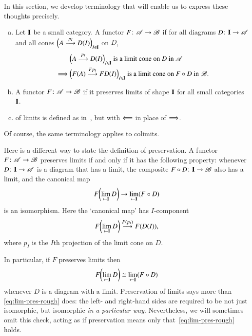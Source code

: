 In this section, we develop terminology that will enable us to express
these thoughts precisely.

\begin{defn}
\begin{enumerate}[(b)]
\item   
\label{defn:pres-lims-shape}
Let $\mathbf{I}$ be a small category.  A functor $F\from \cat{A} \to \cat{B}$
 if for all diagrams $D\from \scat{I} \to
\cat{A}$ and all cones $\Bigl(A \stackrel{p_I}{\longrightarrow} D(I)\Bigr)_{I \in \mathbf{I}}$ on
$D$,
% 
\begin{align*}
        &
\Bigl(A \stackrel{p_I}{\longrightarrow} D(I)\Bigr)_{I \in \mathbf{I}}
\text{ is a limit cone on } D \text{ in }\mathscr{A}\\
\implies        &
\Bigl(F(A) \stackrel{Fp_I}{\longrightarrow} FD(I)\Bigr)_{I \in \mathbf{I}}
\text{ is a limit cone on } F \mathbin{\circ} D \text{ in }\mathscr{B}. 
\end{align*}

\item   
\label{defn:pres-lims-all}
A functor $F\from \cat{A} \to \cat{B}$  if it
preserves limits of shape $\mathbf{I}$ for all small categories $\mathbf{I}$.

\item 
{}%
%
%
%
of limits is defined as in~, but with $\Longleftarrow$
in place of $\Longrightarrow$.
\end{enumerate}
\end{defn}
% 
Of course, the same terminology applies to colimits.

Here is a different way to state the definition of preservation.  A functor
$F\from \cat{A} \to \cat{B}$ preserves limits if and only if it has the
following property: whenever $D\from \scat{I} \to \cat{A}$ is a diagram
that has a limit, the composite $F \of D \from \scat{I} \to \cat{B}$ also
has a limit, and the canonical map
\[
F \biggl( \lim\limits_{\leftarrow \mathbf{I}} D \biggr)
\to
\lim\limits_{\leftarrow \mathbf{I}}(F \mathbin{\circ} D)
\]
is an isomorphism.  Here the `canonical map' has $I$-component 
\[
F \biggl( \lim\limits_{\leftarrow \mathbf{I}} D \biggr)
\stackrel{F(p_I)}{\longrightarrow}
F(D(I)),
\]
where $p_I$ is the $I$th projection of the limit cone on $D$.

In particular, if $F$ preserves limits then
% 
\begin{equation}
\label{eq:lim-pres-rough}
F \biggl( \lim\limits_{\leftarrow \mathbf{I}} D \biggr)
\cong
\lim\limits_{\leftarrow \mathbf{I}}(F \mathbin{\circ} D)
\end{equation}
% 
whenever $D$ is a diagram with a limit.  Preservation of limits says more
than \eqref{eq:lim-pres-rough} does: the left- and right-hand sides are
required to be not just isomorphic, but isomorphic \emph{in a particular
  way}.  Nevertheless, we will sometimes omit this check, acting as if
preservation means only that~\eqref{eq:lim-pres-rough} holds.

